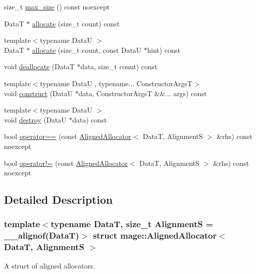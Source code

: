 \begin{DoxyCompactItemize}
size\+\_\+t \hyperlink{structmage_1_1_aligned_allocator_a81ac9662f40f1708d6f8d4e93fa8ee08}{max\+\_\+size} () const noexcept
\item 
DataT $\ast$ \hyperlink{structmage_1_1_aligned_allocator_aa40b7eb431ac79e6b09bbd9e55906e78}{allocate} (size\+\_\+t count) const
\item 
{\footnotesize template$<$typename DataU $>$ }\\DataT $\ast$ \hyperlink{structmage_1_1_aligned_allocator_ae7369bc87b8720a0433f8ceda2a52218}{allocate} (size\+\_\+t count, const DataU $\ast$hint) const
\item 
void \hyperlink{structmage_1_1_aligned_allocator_a7893ac09903ab7c8601e9db45715c5d7}{deallocate} (DataT $\ast$data, size\+\_\+t count) const
\item 
{\footnotesize template$<$typename DataU , typename... Constructor\+ArgsT$>$ }\\void \hyperlink{structmage_1_1_aligned_allocator_a1dab96378ee44579508c6722b9f6164c}{construct} (DataU $\ast$data, Constructor\+ArgsT \&\&... args) const
\item 
{\footnotesize template$<$typename DataU $>$ }\\void \hyperlink{structmage_1_1_aligned_allocator_a5334e1389c6018a91fdfe2db592d2b74}{destroy} (DataU $\ast$data) const
\item 
bool \hyperlink{structmage_1_1_aligned_allocator_a3577dfd220aaf85e07ecd1770101a087}{operator==} (const \hyperlink{structmage_1_1_aligned_allocator}{Aligned\+Allocator}$<$ DataT, AlignmentS $>$ \&rhs) const noexcept
\item 
bool \hyperlink{structmage_1_1_aligned_allocator_a878ebf0d8ad7e6e91bc9d788c8bdbbc7}{operator!=} (const \hyperlink{structmage_1_1_aligned_allocator}{Aligned\+Allocator}$<$ DataT, AlignmentS $>$ \&rhs) const noexcept
\end{DoxyCompactItemize}


\subsection{Detailed Description}
\subsubsection*{template$<$typename DataT, size\+\_\+t AlignmentS = \+\_\+\+\_\+alignof(\+Data\+T)$>$\newline
struct mage\+::\+Aligned\+Allocator$<$ Data\+T, Alignment\+S $>$}

A struct of aligned allocators.


